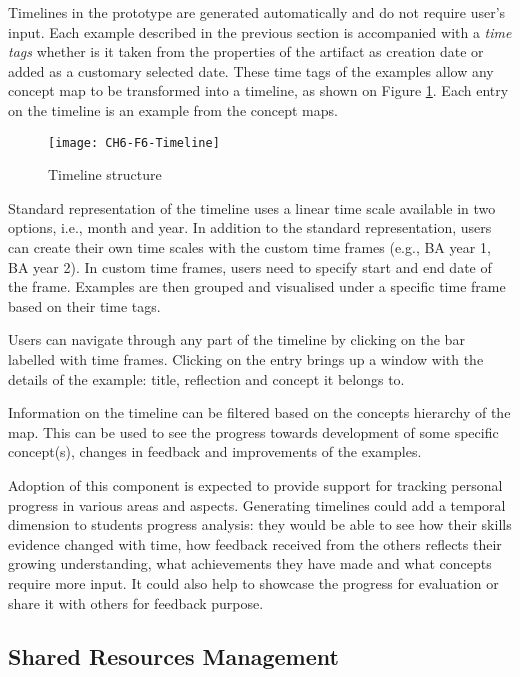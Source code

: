 Timelines in the prototype are generated automatically and do not require
user's input. Each example described in the previous section is accompanied with
a \textit{time tags} whether is it taken from the properties of the artifact as
creation date or added as a customary selected date. These time tags of the
examples allow any concept map to be transformed into a timeline, as shown on
Figure \ref{fig:timeline}. Each entry on the timeline is an example from the
concept maps.

\begin{figure}[htb]
\centering 
\texttt{[image: CH6-F6-Timeline]}
\caption{Timeline structure}
\label{fig:timeline}
\end{figure}

Standard representation of the timeline uses a linear time scale available in
two options, i.e., month and year. In addition to the standard representation,
users can create their own time scales with the custom time frames (e.g., BA
year 1, BA year 2). In custom time frames, users need to specify start and end
date of the frame. Examples are then grouped and visualised under a specific
time frame based on their time tags. 

Users can navigate through any part of the timeline by clicking on the bar
labelled with time frames. Clicking on the entry brings up a window with the
details of the example: title, reflection and concept it belongs to.

Information on the timeline can be filtered based on the concepts hierarchy of
the map. This can be used to see the progress towards development of some
specific concept(s), changes in feedback and improvements of the examples.

Adoption of this component is expected to provide support for tracking personal
progress in various areas and aspects. Generating timelines could add a temporal
dimension to students progress analysis: they would be able to see how their
skills evidence changed with time, how feedback received from the others
reflects their growing understanding, what achievements they have made and what
concepts require more input. It could also help to showcase the progress for
evaluation or share it with others for feedback purpose.

\subsection{Shared Resources Management}
\label{sec:sharing}

